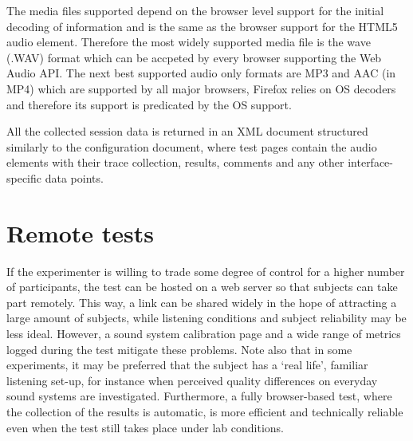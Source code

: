 \documentclass{sig-alternate}
\begin{document}
    The media files supported depend on the browser level support for the initial decoding of information and is the same as the browser support for the HTML5 audio element. Therefore the most widely supported media file is the wave (.WAV) format which can be accpeted by every browser supporting the Web Audio API. The next best supported audio only formats are MP3 and AAC (in MP4) which are supported by all major browsers, Firefox relies on OS decoders and therefore its support is predicated by the OS support.
    
    All the collected session data is returned in an XML document structured similarly to the configuration document, where test pages contain the audio elements with their trace collection, results, comments and any other interface-specific data points.
    


	



	
	
\section{Remote tests} %
	\label{sec:remote}

	If the experimenter is willing to trade some degree of control for a higher number of participants, the test can be hosted on a web server so that subjects can take part remotely. This way, a link can be shared widely in the hope of attracting a large amount of subjects, while listening conditions and subject reliability may be less ideal. However, a sound system calibration page and a wide range of metrics logged during the test mitigate these problems. Note also that in some experiments, it may be preferred that the subject has a `real life', familiar listening set-up, for instance when perceived quality differences on everyday sound systems are investigated. 
	Furthermore, a fully browser-based test, where the collection of the results is automatic, is more efficient and technically reliable even when the test still takes place under lab conditions.
\end{document}
